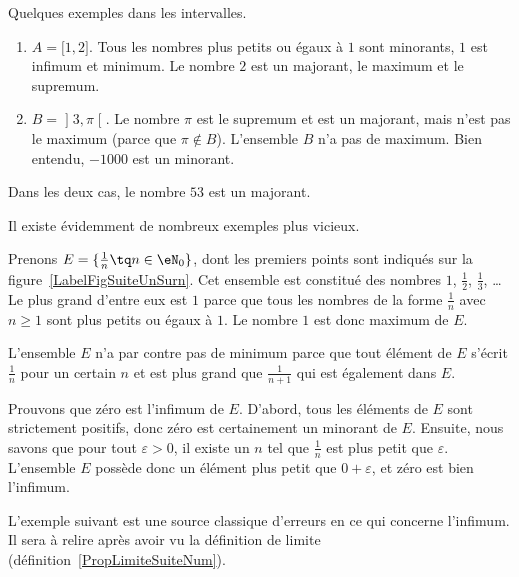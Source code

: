 \begin{example}
	Quelques exemples dans les intervalles.
	\begin{enumerate}
		\item
		      \( A=\mathopen[ 1 , 2 \mathclose]\). Tous les nombres plus petits ou égaux à \( 1\) sont minorants, \( 1\) est infimum et minimum. Le nombre \( 2\) est un majorant, le maximum et le supremum.
		\item
		      \( B=\mathopen] 3 , \pi \mathclose[\). Le nombre \( \pi\) est le supremum et est un majorant, mais n'est pas le maximum (parce que \( \pi\notin B\)). L'ensemble \( B\) n'a pas de maximum. Bien entendu, \( -1000\) est un minorant.
	\end{enumerate}
	Dans les deux cas, le nombre \( 53\) est un majorant.
\end{example}

Il existe évidemment de nombreux exemples plus vicieux.

\begin{example}
	Prenons \( E=\{ \frac{1}{ n }\tq n\in\eN_0 \}\), dont les premiers points sont indiqués sur la figure~\ref{LabelFigSuiteUnSurn}. Cet ensemble est constitué des nombres \( 1\), \( \frac{ 1 }{2}\), \( \frac{1}{ 3 }\), \ldots Le plus grand d'entre eux est \( 1\) parce que tous les nombres de la forme \( \frac{1}{ n }\) avec \( n\geq 1\) sont plus petits ou égaux à \( 1\). Le nombre \( 1\) est donc maximum de \( E\).

	L'ensemble \( E\) n'a par contre pas de minimum parce que tout élément de \( E\) s'écrit \( \frac{1}{ n }\) pour un certain \( n\) et est plus grand que \( \frac{1}{ n+1 }\) qui est également dans \( E\).

	Prouvons que zéro est l'infimum de \( E\). D'abord, tous les éléments de \( E\) sont strictement positifs, donc zéro est certainement un minorant de \( E\). Ensuite, nous savons que pour tout \( \varepsilon>0\), il existe un \( n\) tel que \( \frac{1}{ n }\) est plus petit que \( \varepsilon\). L'ensemble \( E\) possède donc un élément plus petit que \( 0+\varepsilon\), et zéro est bien l'infimum.
\end{example}

\newcommand{\CaptionFigSuiteUnSurn}{Les premiers points du type \( x_n=1/n\).}


L'exemple suivant est une source classique d'erreurs en ce qui concerne l'infimum. Il sera à relire après avoir vu la définition de limite (définition~\ref{PropLimiteSuiteNum}).

